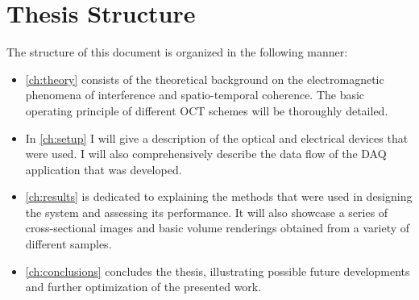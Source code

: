 \section{Thesis Structure}
The structure of this document is organized in the following manner:
\begin{itemize}
	\item \autoref{ch:theory} consists of the theoretical background on the electromagnetic phenomena of interference and spatio-temporal coherence. The basic operating principle of different OCT schemes will be thoroughly detailed. 
	\item In \autoref{ch:setup} I will give a description of the optical and electrical devices that were used. I will also comprehensively describe the data flow of the \ac{DAQ} application that was developed. 
	\item \autoref{ch:results} is dedicated to explaining the methods that were used in designing the system and assessing its performance. It will also showcase a series of cross-sectional images and basic volume renderings obtained from a variety of different samples. 
	\item \autoref{ch:conclusions} concludes the thesis, illustrating possible future developments and further optimization of the presented work.  
\end{itemize}


% 

% 

% 

% 

